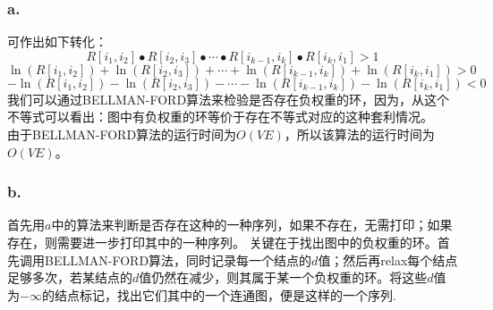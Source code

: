 \documentclass[twocolumn]{ctexart}
\begin{document}
		\subsubsection*{a.}
			可作出如下转化：
			\begin{displaymath}
				R[i_1,i_2]\bullet R[i_2,i_3]\bullet\cdots\bullet R[i_{k-1},i_k]\bullet R[i_k,i_1]>1 
			\end{displaymath}
			\begin{displaymath}
				\ln(R[i_1,i_2])+\ln(R[i_2,i_3])+\cdots+\ln(R[i_{k-1},i_k])+\ln(R[i_k,i_1])>0
			\end{displaymath}
			\begin{displaymath}
			-\ln(R[i_1,i_2])-\ln(R[i_2,i_3])-\cdots-\ln(R[i_{k-1},i_k])-\ln(R[i_k,i_1])<0
			\end{displaymath}
			我们可以通过BELLMAN-FORD算法来检验是否存在负权重的环，因为，从这个不等式可以看出：图中有负权重的环等价于存在不等式对应的这种套利情况。\\
			由于BELLMAN-FORD算法的运行时间为$O(VE)$，所以该算法的运行时间为$O(VE)$。
		\subsubsection*{b.}
			首先用$a$中的算法来判断是否存在这种的一种序列，如果不存在，无需打印；如果存在，则需要进一步打印其中的一种序列。
			关键在于找出图中的负权重的环。首先调用BELLMAN-FORD算法，同时记录每一个结点的$d$值；然后再relax每个结点足够多次，若某结点的$d$值仍然在减少，则其属于某一个负权重的环。将这些$d$值为$-\infty$的结点标记，找出它们其中的一个连通图，便是这样的一个序列.
			
\end{document}

